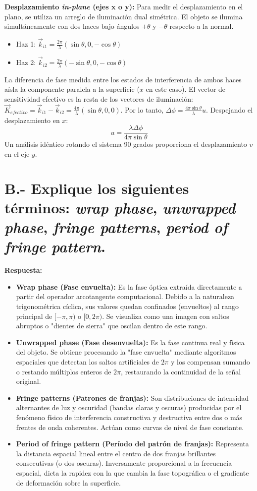 \documentclass[12pt,letterpaper]{article}
\begin{document}
	\textbf{Desplazamiento \textit{in-plane} (ejes x o y):}
	Para medir el desplazamiento en el plano, se utiliza un arreglo de iluminación dual simétrica. El objeto se ilumina simultáneamente con dos haces bajo ángulos $+\theta$ y $-\theta$ respecto a la normal.
	\begin{itemize}
		\item Haz 1: $\vec{k}_{i1} = \frac{2\pi}{\lambda}(\sin\theta, 0, -\cos\theta)$
		\item Haz 2: $\vec{k}_{i2} = \frac{2\pi}{\lambda}(-\sin\theta, 0, -\cos\theta)$
	\end{itemize}
	La diferencia de fase medida entre los estados de interferencia de ambos haces aísla la componente paralela a la superficie ($x$ en este caso). El vector de sensitividad efectivo es la resta de los vectores de iluminación: $\vec{K}_{efectivo} = \vec{k}_{i1} - \vec{k}_{i2} = \frac{4\pi}{\lambda}(\sin\theta, 0, 0)$.
	Por lo tanto, $\Delta\phi = \frac{4\pi \sin\theta}{\lambda} u$.
	Despejando el desplazamiento en $x$:
	\[
	u = \frac{\lambda \Delta\phi}{4\pi \sin\theta}
	\]
	Un análisis idéntico rotando el sistema 90 grados proporciona el desplazamiento $v$ en el eje $y$.
	
	\section*{B.- Explique los siguientes términos: \textit{wrap phase}, \textit{unwrapped phase}, \textit{fringe patterns}, \textit{period of fringe pattern}.}
	
	\textbf{Respuesta:}
	\begin{itemize}
		\item \textbf{Wrap phase (Fase envuelta):} Es la fase óptica extraída directamente a partir del operador arcotangente computacional. Debido a la naturaleza trigonométrica cíclica, sus valores quedan confinados (envueltos) al rango principal de $[-\pi, \pi)$ o $[0, 2\pi)$. Se visualiza como una imagen con saltos abruptos o "dientes de sierra" que oscilan dentro de este rango.
		\item \textbf{Unwrapped phase (Fase desenvuelta):} Es la fase continua real y física del objeto. Se obtiene procesando la "fase envuelta" mediante algoritmos espaciales que detectan los saltos artificiales de $2\pi$ y los compensan sumando o restando múltiplos enteros de $2\pi$, restaurando la continuidad de la señal original.
		\item \textbf{Fringe patterns (Patrones de franjas):} Son distribuciones de intensidad alternantes de luz y oscuridad (bandas claras y oscuras) producidas por el fenómeno físico de interferencia constructiva y destructiva entre dos o más frentes de onda coherentes. Actúan como curvas de nivel de fase constante.
		\item \textbf{Period of fringe pattern (Período del patrón de franjas):} Representa la distancia espacial lineal entre el centro de dos franjas brillantes consecutivas (o dos oscuras). Inversamente proporcional a la frecuencia espacial, dicta la rapidez con la que cambia la fase topográfica o el gradiente de deformación sobre la superficie.
	\end{itemize}
	
\end{document}
